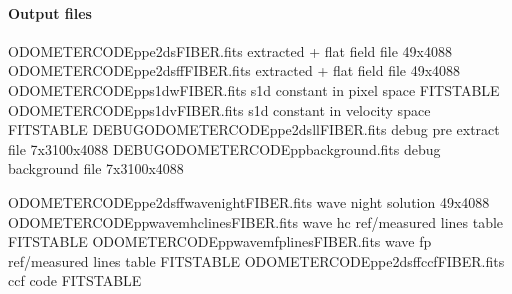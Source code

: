 \documentclass[a4paper,10pt,english]{report}
\begin{document}
\paragraph{Output files}
\label{\detokenize{user/spirou/recipes/wave_local:output-files}}
\begin{sphinxVerbatim}[commandchars=\\\{\}]
ODOMETER\PYGZus{}CODE\PYGZus{}pp\PYGZus{}e2ds\PYGZus{}FIBER.fits               extracted + flat field file 49x4088
ODOMETER\PYGZus{}CODE\PYGZus{}pp\PYGZus{}e2dsff\PYGZus{}FIBER.fits             extracted + flat field file 49x4088
ODOMETER\PYGZus{}CODE\PYGZus{}pp\PYGZus{}s1d\PYGZus{}w\PYGZus{}FIBER.fits              s1d constant in pixel space FITS\PYGZhy{}TABLE
ODOMETER\PYGZus{}CODE\PYGZus{}pp\PYGZus{}s1d\PYGZus{}v\PYGZus{}FIBER.fits              s1d constant in velocity space FITS\PYGZhy{}TABLE
DEBUG\PYGZus{}ODOMETER\PYGZus{}CODE\PYGZus{}pp\PYGZus{}e2dsll\PYGZus{}FIBER.fits       debug pre extract file 7x3100x4088
DEBUG\PYGZus{}ODOMETER\PYGZus{}CODE\PYGZus{}pp\PYGZus{}background.fits           debug background file 7x3100x4088

ODOMETER\PYGZus{}CODE\PYGZus{}pp\PYGZus{}e2dsff\PYGZus{}\PYGZus{}wave\PYGZus{}night\PYGZus{}FIBER.fits      wave night solution 49x4088
ODOMETER\PYGZus{}CODE\PYGZus{}pp\PYGZus{}wavem\PYGZus{}hclines\PYGZus{}FIBER.fits        wave hc ref/measured lines table FITS\PYGZhy{}TABLE
ODOMETER\PYGZus{}CODE\PYGZus{}pp\PYGZus{}wavem\PYGZus{}fplines\PYGZus{}FIBER.fits       wave fp ref/measured lines table FITS\PYGZhy{}TABLE
ODOMETER\PYGZus{}CODE\PYGZus{}pp\PYGZus{}e2dsff\PYGZus{}ccf\PYGZus{}FIBER.fits           ccf code \PYG{o}{[}FITS\PYGZhy{}TABLE\PYG{o}{]}
\end{sphinxVerbatim}
\end{document}
